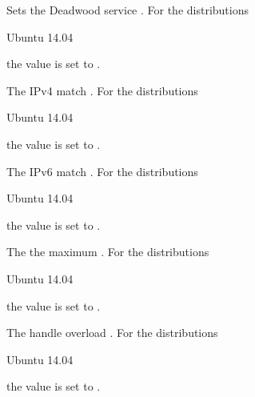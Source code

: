 Sets the Deadwood service .
For the distributions
\begin{inparaitem}
\item[\TheDistribution{ubuntu}] Ubuntu 14.04
\end{inparaitem}
the value is set to .


The IPv4 match .
For the distributions
\begin{inparaitem}
\item[\TheDistribution{ubuntu}] Ubuntu 14.04
\end{inparaitem}
the value is set to .


The IPv6 match .
For the distributions
\begin{inparaitem}
\item[\TheDistribution{ubuntu}] Ubuntu 14.04
\end{inparaitem}
the value is set to .


The the maximum .
For the distributions
\begin{inparaitem}
\item[\TheDistribution{ubuntu}] Ubuntu 14.04
\end{inparaitem}
the value is set to .


The handle overload .
For the distributions
\begin{inparaitem}
\item[\TheDistribution{ubuntu}] Ubuntu 14.04
\end{inparaitem}
the value is set to .

